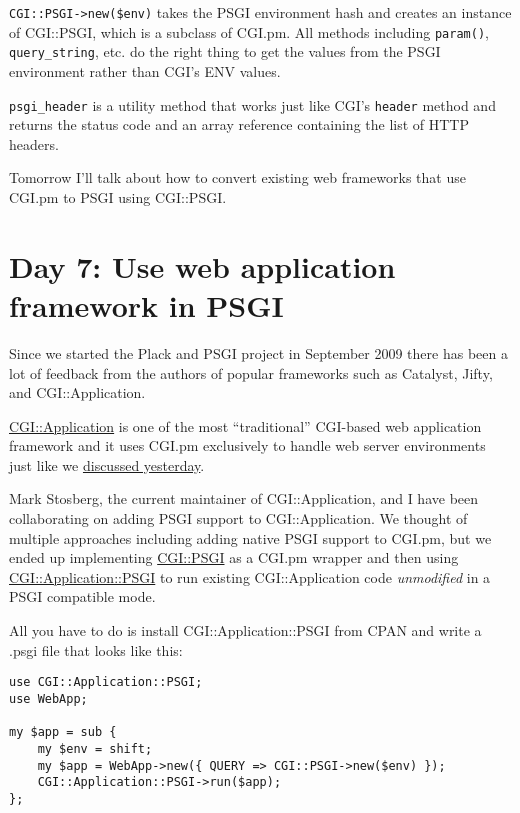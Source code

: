 \lstinline!CGI::PSGI->new($env)! takes the PSGI environment hash and
creates an instance of CGI::PSGI, which is a subclass of CGI.pm. All
methods including \lstinline!param()!, \lstinline!query_string!, etc. do
the right thing to get the values from the PSGI environment rather than
CGI's ENV values.

\lstinline!psgi_header! is a utility method that works just like CGI's
\lstinline!header! method and returns the status code and an array
reference containing the list of HTTP headers.

Tomorrow I'll talk about how to convert existing web frameworks that use
CGI.pm to PSGI using CGI::PSGI.

\section{Day 7: Use web application framework in
PSGI}\label{day-7-use-web-application-framework-in-psgi}

Since we started the Plack and PSGI project in September 2009 there has
been a lot of feedback from the authors of popular frameworks such as
Catalyst, Jifty, and CGI::Application.

\href{http://cgi-app.org/}{CGI::Application} is one of the most
``traditional'' CGI-based web application framework and it uses CGI.pm
exclusively to handle web server environments just like we
\href{http://advent.plackperl.org/2009/12/day-6-convert-cgi-apps-to-psgi.html}{discussed
yesterday}.

Mark Stosberg, the current maintainer of CGI::Application, and I have
been collaborating on adding PSGI support to CGI::Application. We
thought of multiple approaches including adding native PSGI support to
CGI.pm, but we ended up implementing
\href{http://search.cpan.org/perldoc?CGI::PSGI}{CGI::PSGI} as a CGI.pm
wrapper and then using
\href{http://search.cpan.org/perldoc?CGI::Application::PSGI}{CGI::Application::PSGI}
to run existing CGI::Application code \emph{unmodified} in a PSGI
compatible mode.

All you have to do is install CGI::Application::PSGI from CPAN and write
a .psgi file that looks like this:

\begin{lstlisting}
use CGI::Application::PSGI;
use WebApp;

my $app = sub {
    my $env = shift;
    my $app = WebApp->new({ QUERY => CGI::PSGI->new($env) });
    CGI::Application::PSGI->run($app);
};
\end{lstlisting}

